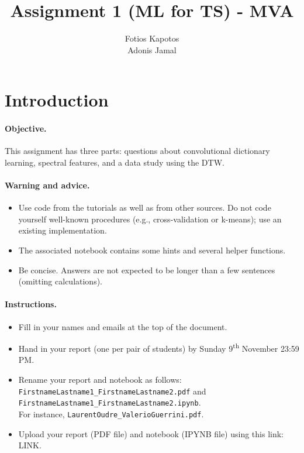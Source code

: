 \documentclass[11pt]{article}
\title{Assignment 1 (ML for TS) - MVA}
\author{
Fotios Kapotos \email{fotiskapotos@gmail.com} \\ %
Adonis Jamal \email{adonis.jamal@student-cs.fr} %
}
\begin{document}
\maketitle

\section{Introduction}

\paragraph{Objective.} This assignment has three parts: questions about convolutional dictionary learning, spectral features, and a data study using the DTW. 

\paragraph{Warning and advice.} 
\begin{itemize}
    \item Use code from the tutorials as well as from other sources. Do not code yourself well-known procedures (e.g., cross-validation or k-means); use an existing implementation. 
    \item The associated notebook contains some hints and several helper functions.
    \item Be concise. Answers are not expected to be longer than a few sentences (omitting calculations).
\end{itemize}



\paragraph{Instructions.}
\begin{itemize}
    \item Fill in your names and emails at the top of the document.
    \item Hand in your report (one per pair of students) by Sunday 9\textsuperscript{th} November 23:59 PM.
    \item Rename your report and notebook as follows:\\ \texttt{FirstnameLastname1\_FirstnameLastname2.pdf} and\\ \texttt{FirstnameLastname1\_FirstnameLastname2.ipynb}.\\
    For instance, \texttt{LaurentOudre\_ValerioGuerrini.pdf}.
    \item Upload your report (PDF file) and notebook (IPYNB file) using this link: \footnotesize{LINK}.
\end{itemize}
\end{document}
